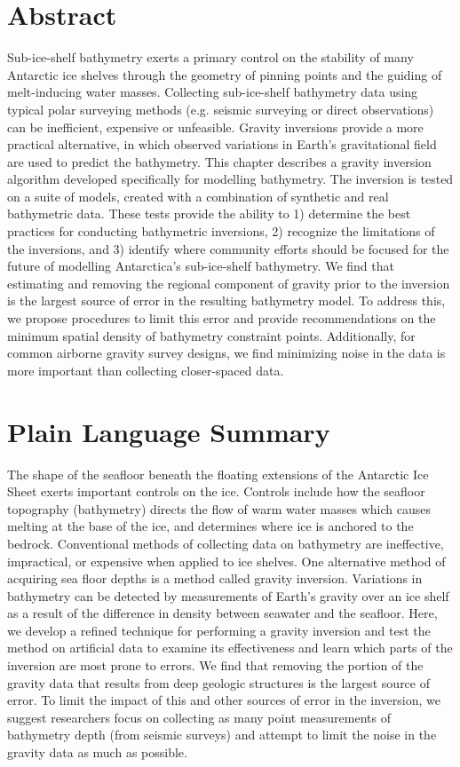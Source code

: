 
\section*{Abstract}

Sub-ice-shelf bathymetry exerts a primary control on the stability of many Antarctic ice shelves through the geometry of pinning points and the guiding of melt-inducing water masses. Collecting sub-ice-shelf bathymetry data using typical polar surveying methods (e.g. seismic surveying or direct observations) can be inefficient, expensive or unfeasible. Gravity inversions provide a more practical alternative, in which observed variations in Earth's gravitational field are used to predict the bathymetry. This chapter describes a gravity inversion algorithm developed specifically for modelling bathymetry. The inversion is tested on a suite of models, created with a combination of synthetic and real bathymetric data. These tests provide the ability to 1) determine the best practices for conducting bathymetric inversions, 2) recognize the limitations of the inversions, and 3) identify where community efforts should be focused for the future of modelling Antarctica's sub-ice-shelf bathymetry. We find that estimating and removing the regional component of gravity prior to the inversion is the largest source of error in the resulting bathymetry model. To address this, we propose procedures to limit this error and provide recommendations on the minimum spatial density of bathymetry constraint points. Additionally, for common airborne gravity survey designs, we find minimizing noise in the  data is more important than collecting closer-spaced data.

\section*{Plain Language Summary}

The shape of the seafloor beneath the floating extensions of the Antarctic Ice Sheet exerts important controls on the ice. Controls include how the seafloor topography (bathymetry) directs the flow of warm water masses which causes melting at the base of the ice, and determines where ice is anchored to the bedrock. Conventional methods of collecting data on bathymetry are ineffective, impractical, or expensive when applied to ice shelves. One alternative method of acquiring sea floor depths is a method called gravity inversion. Variations in bathymetry can be detected by measurements of Earth's gravity over an ice shelf as a result of the difference in density between seawater and the seafloor. Here, we develop a refined technique for performing a gravity inversion and test the method on artificial data to examine its effectiveness and learn which parts of the inversion are most prone to errors. We find that removing the portion of the gravity data that results from deep geologic structures is the largest source of error. To limit the impact of this and other sources of error in the inversion, we suggest researchers focus on collecting as many point measurements of bathymetry depth (from seismic surveys) and attempt to limit the noise in the gravity data as much as possible. 

